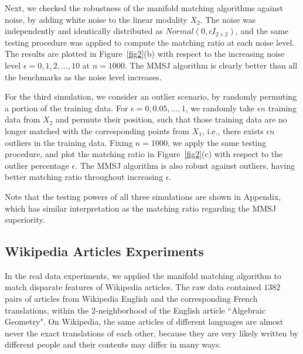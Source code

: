 \documentclass[times,twocolumn,final]{elsarticle}
\begin{document}
Next, we checked the robustness of the manifold matching algorithms against noise, by adding white noise to the linear modality $X_{2}$. The noise was independently and identically distributed as $Normal(0, \epsilon I_{2 \times 2})$, and the same testing procedure was applied to compute the matching ratio at each noise level. The results are plotted in Figure~\ref{fig2}(b) with respect to the increasing noise level $\epsilon = 0,1,2,\ldots,10$ at $n=1000$. The MMSJ algorithm is clearly better than all the benchmarks as the noise level increases.

For the third simulation, we consider an outlier scenario, by randomly permuting a portion of the training data. For $\epsilon=0,0.05,\ldots,1$, we randomly take $\epsilon n$ training data from $X_{2}$ and permute their position, such that those training data are no longer matched with the corresponding points from $X_{1}$, i.e., there exists $\epsilon n$ outliers in the training data. Fixing $n=1000$, we apply the same testing procedure, and plot the matching ratio in Figure~\ref{fig2}(c) with respect to the outlier percentage $\epsilon$. The MMSJ algorithm is also robust against outliers, having better matching ratio throughout increasing $\epsilon$.


Note that the testing powers of all three simulations are shown in Appendix, which has similar interpretation as the matching ratio regarding the MMSJ superiority.

\subsection{Wikipedia Articles Experiments}
\label{wikiReal}
In the real data experiments, we applied the manifold matching algorithm to match disparate features of Wikipedia articles. The raw data contained $1382$ pairs of articles from Wikipedia English and the corresponding French translations, within the 2-neighborhood of the English article ``Algebraic Geometry". On Wikipedia, the same articles of different languages are almost never the exact translations of each other, because they are very likely written by different people and their contents may differ in many ways.
\end{document}
